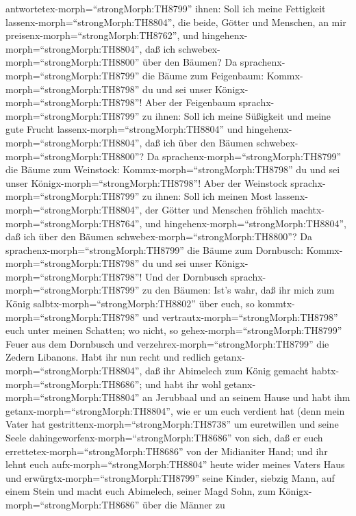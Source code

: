 antwortetex-morph=``strongMorph:TH8799'' ihnen: Soll ich meine
Fettigkeit lassenx-morph=``strongMorph:TH8804'', die beide, Götter und
Menschen, an mir preisenx-morph=``strongMorph:TH8762'', und
hingehenx-morph=``strongMorph:TH8804'', daß ich
schwebex-morph=``strongMorph:TH8800'' über den Bäumen?  Da
sprachenx-morph=``strongMorph:TH8799'' die Bäume zum Feigenbaum:
Kommx-morph=``strongMorph:TH8798'' du und sei unser
Königx-morph=``strongMorph:TH8798''!  Aber der Feigenbaum
sprachx-morph=``strongMorph:TH8799'' zu ihnen: Soll ich meine Süßigkeit
und meine gute Frucht lassenx-morph=``strongMorph:TH8804'' und
hingehenx-morph=``strongMorph:TH8804'', daß ich über den Bäumen
schwebex-morph=``strongMorph:TH8800''?  Da
sprachenx-morph=``strongMorph:TH8799'' die Bäume zum Weinstock:
Kommx-morph=``strongMorph:TH8798'' du und sei unser
Königx-morph=``strongMorph:TH8798''!  Aber der Weinstock
sprachx-morph=``strongMorph:TH8799'' zu ihnen: Soll ich meinen Most
lassenx-morph=``strongMorph:TH8804'', der Götter und Menschen fröhlich
machtx-morph=``strongMorph:TH8764'', und
hingehenx-morph=``strongMorph:TH8804'', daß ich über den Bäumen
schwebex-morph=``strongMorph:TH8800''?  Da
sprachenx-morph=``strongMorph:TH8799'' die Bäume zum Dornbusch:
Kommx-morph=``strongMorph:TH8798'' du und sei unser
Königx-morph=``strongMorph:TH8798''!  Und der Dornbusch
sprachx-morph=``strongMorph:TH8799'' zu den Bäumen: Ist's wahr, daß ihr
mich zum König salbtx-morph=``strongMorph:TH8802'' über euch, so
kommtx-morph=``strongMorph:TH8798'' und
vertrautx-morph=``strongMorph:TH8798'' euch unter meinen Schatten; wo
nicht, so gehex-morph=``strongMorph:TH8799'' Feuer aus dem Dornbusch und
verzehrex-morph=``strongMorph:TH8799'' die Zedern Libanons.
 Habt ihr nun recht und redlich
getanx-morph=``strongMorph:TH8804'', daß ihr Abimelech zum König gemacht
habtx-morph=``strongMorph:TH8686''; und habt ihr wohl
getanx-morph=``strongMorph:TH8804'' an Jerubbaal und an seinem Hause und
habt ihm getanx-morph=``strongMorph:TH8804'', wie er um euch verdient
hat  (denn mein Vater hat
gestrittenx-morph=``strongMorph:TH8738'' um euretwillen und seine Seele
dahingeworfenx-morph=``strongMorph:TH8686'' von sich, daß er euch
errettetex-morph=``strongMorph:TH8686'' von der Midianiter Hand;
 und ihr lehnt euch aufx-morph=``strongMorph:TH8804'' heute
wider meines Vaters Haus und erwürgtx-morph=``strongMorph:TH8799'' seine
Kinder, siebzig Mann, auf einem Stein und macht euch Abimelech, seiner
Magd Sohn, zum Königx-morph=``strongMorph:TH8686'' über die Männer zu
